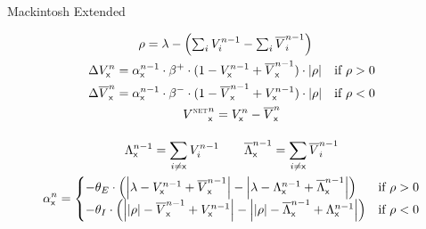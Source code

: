\documentclass[border=10pt,varwidth]{standalone}
\begin{document}
\newcommand{\eks}{\textsf{x}}
\newcommand{\longlambda}{\rlap{$\,\lambda$}\phantom{\big| \rho \big|}}
\newcommand{\longI}{\rlap{$I$}\phantom{E}}

\begin{center}
	\huge
	\sffamily
	Mackintosh Extended
\end{center}
\begin{gather*}
	\begin{aligned}
		\rho &= \lambda - \left( \textstyle\sum_i V_i^{n - 1} - \textstyle\sum_i \overline{V}_i^{n - 1} \right)
	\end{aligned} \\
	\begin{aligned}
		\Delta V_\eks^n &= \alpha_\eks^{n - 1} \cdot \beta^+ \cdot (1 - V_\eks^{n - 1} + \overline{V}_\eks^{n - 1}) \cdot \left| \rho \right| & \text{if } \rho > 0 \\
		 \Delta \overline{V}_\eks^n &= \alpha_\eks^{n - 1} \cdot \beta^- \cdot (1 - \overline{V}_\eks^{n - 1} + V_\eks^{n - 1}) \cdot \left| \rho \right| & \text{if } \rho < 0
	\end{aligned} \\
	{V^{\text{\tiny\scshape NET}}}_\eks^n = V_\eks^n - \overline{V}_\eks^n \\[1em]
	\Lambda^{n - 1}_\eks = \sum_{i \neq \eks} V^{n - 1}_i \qquad
	\overline{\Lambda}^{n - 1}_\eks = \sum_{i \neq \eks} \overline{V}^{n - 1}_i \\
	\alpha_\eks^n =
		\begin{cases}
			- \theta_E \cdot \left( \left| \lambda - V^{n - 1}_\eks + \overline{V}^{n - 1}_\eks \right| - \left| \lambda - \Lambda^{n - 1}_\eks + \overline{\Lambda}^{n - 1}_\eks \right| \right) &\text{if } \rho > 0 \\
			- \theta_I \cdot \left( \left| \left| \rho \right| - \overline{V}^{n - 1}_\eks + V^{n - 1}_\eks \right| - \left| \left| \rho \right| - \overline{\Lambda}^{n - 1}_\eks + \Lambda^{n - 1}_\eks \right| \right) &\text{if } \rho < 0
		\end{cases}
\end{gather*}

\nocite{lepelley}

\end{document}
